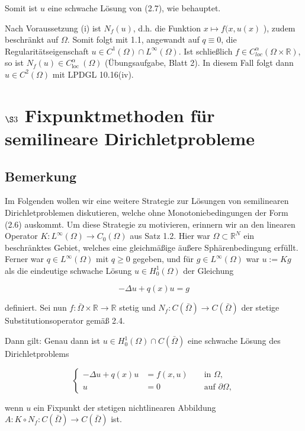 \documentclass[10pt, letterpaper]{article}
\begin{document}
Somit ist $u$ eine schwache Lösung von (2.7), wie behauptet.

Nach Voraussetzung (i) ist $N_{f}(u)$, d.h. die Funktion $x \mapsto f(x, u(x)$ ), zudem beschränkt auf $\Omega$. Somit folgt mit 1.1, angewandt auf $q \equiv 0$, die Regularitätseigenschaft $u \in C^{1}(\Omega) \cap L^{\infty}(\Omega)$. Ist schließlich $f \in C_{l o c}^{\alpha}(\Omega \times \mathbb{R})$, so ist $N_{f}(u) \in C_{\text {loc }}^{\alpha}(\Omega)$ (Übungsaufgabe, Blatt 2). In diesem Fall folgt dann $u \in C^{2}(\Omega)$ mit LPDGL 10.16(iv).

\section*{$\S 3$ Fixpunktmethoden für semilineare Dirichletprobleme}

\subsection*{Bemerkung}

Im Folgenden wollen wir eine weitere Strategie zur Lösungen von semilinearen Dirichletproblemen diskutieren, welche ohne Monotoniebedingungen der Form (2.6) auskommt. Um diese Strategie zu motivieren, erinnern wir an den linearen Operator $K: L^{\infty}(\Omega) \rightarrow C_{0}(\Omega)$ aus Satz 1.2. Hier war $\Omega \subset \mathbb{R}^{N}$ ein beschränktes Gebiet, welches eine gleichmäßige äußere Sphärenbedingung erfüllt. Ferner war $q \in L^{\infty}(\Omega)$ mit $q \geq 0$ gegeben, und für $g \in L^{\infty}(\Omega)$ war $u:=K g$ als die eindeutige schwache Lösung $u \in H_{0}^{1}(\Omega)$ der Gleichung

$$
-\Delta u+q(x) u=g
$$

definiert. Sei nun $f: \bar{\Omega} \times \mathbb{R} \rightarrow \mathbb{R}$ stetig und $N_{f}: C(\bar{\Omega}) \rightarrow C(\bar{\Omega})$ der stetige Substitutionsoperator gemäß 2.4.

Dann gilt: Genau dann ist $u \in H_{0}^{1}(\Omega) \cap C(\bar{\Omega})$ eine schwache Lösung des Dirichletproblems

$$
\left\{\begin{aligned}
-\Delta u+q(x) u & =f(x, u) & & \text { in } \Omega, \\
u & =0 & & \text { auf } \partial \Omega,
\end{aligned}\right.
$$

wenn $u$ ein Fixpunkt der stetigen nichtlinearen Abbildung $A: K \circ N_{f}: C(\bar{\Omega}) \rightarrow C(\bar{\Omega})$ ist.
\end{document}
